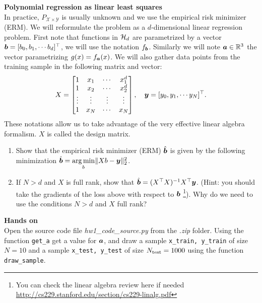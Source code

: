 \documentclass{article}
\newcommand{\bb}{b}
\begin{document}
\textbf{\color{nyupurple} Polynomial regression as linear least squares}\\
In practice, $P_{\mathcal{X} \times \mathcal{Y}}$ is usually unknown and we use the empirical risk minimizer (ERM). We will reformulate the problem as a $d$-dimensional linear regression problem. 
First note that functions in ${\mathcal{H}}_d$ are parametrized by a vector $\bs \bb = [\bb_0, \bb_1, \cdots \bb_d]^\top$, we will use the notation $f_{\bs \bb}$. Similarly we will note $\boldsymbol{a} \in {\mathbb{R}}^3$ the vector parametrizing $g(x) = f_{\boldsymbol{a}}(x)$. We will also gather data points from the training sample in the following matrix and vector:
\begin{align}
    X = \left[\begin{matrix}
    1 & x_1 & \cdots & x_1^d \\
    1 & x_2 & \cdots & x_2^d \\
    \vdots & \vdots & \vdots & \vdots \\
    1 & x_N & \cdots & x_N
\end{matrix} \right], \quad 
\boldsymbol{y} = [y_0, y_1, \cdots y_N]^\top.
\end{align}
These notations allow us to take advantage of the very effective linear algebra formalism. $X$ is called the design matrix.
\begin{enumerate}
\setcounter{enumi}{\value{saveenum}}
    \item Show that the empirical risk minimizer (ERM) $\hat{\bs \bb}$ is given by the following minimization $\hat{\bs \bb} = \underset{\bb}{\arg\min}\lVert X\bb - \bs y \Vert_2^2$.
    
    \item If $N > d$ and $X$ is full rank, show that $\hat{\bs \bb} = (X^\top X)^{-1}X^\top \bs y$. (Hint: you should take the gradients of the loss above with respect to $\bs \bb$ \footnote{You can check the linear algebra review here if needed \url{http://cs229.stanford.edu/section/cs229-linalg.pdf}}). Why do we need to use the conditions $N > d$ and $X$ full rank?  
    
\setcounter{saveenum}{\value{enumi}}  
\end{enumerate}

\textbf{\color{nyupurple} Hands on}\\
Open the source code file \emph{hw1\_code\_source.py} from the \emph{.zip} folder. Using the function \texttt{get\_a}  get a value for $\boldsymbol{a}$, and draw a sample \texttt{x\_train, y\_train} of size $N=10$ and a sample \texttt{x\_test, y\_test} of size $N_{\rm test}=1000$ using the function \texttt{draw\_sample}.
\end{document}
